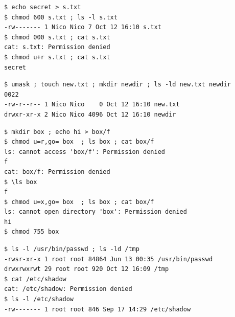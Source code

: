 \documentclass[11pt,a4paper]{article}
\begin{document}
\begin{lstlisting}[caption={Permissions of a file}]
$ echo secret > s.txt
$ chmod 600 s.txt ; ls -l s.txt
-rw------- 1 Nico Nico 7 Oct 12 16:10 s.txt
$ chmod 000 s.txt ; cat s.txt
cat: s.txt: Permission denied
$ chmod u+r s.txt ; cat s.txt
secret
\end{lstlisting}

\begin{lstlisting}[caption={umask and the permissions of new files}]
$ umask ; touch new.txt ; mkdir newdir ; ls -ld new.txt newdir
0022
-rw-r--r-- 1 Nico Nico    0 Oct 12 16:10 new.txt
drwxr-xr-x 2 Nico Nico 4096 Oct 12 16:10 newdir
\end{lstlisting}

\begin{lstlisting}[caption={The box experiment: read-only and execute-only directory}]
$ mkdir box ; echo hi > box/f
$ chmod u=r,go= box  ; ls box ; cat box/f
ls: cannot access 'box/f': Permission denied
f
cat: box/f: Permission denied
$ \ls box
f
$ chmod u=x,go= box  ; ls box ; cat box/f
ls: cannot open directory 'box': Permission denied
hi
$ chmod 755 box
\end{lstlisting}

\begin{lstlisting}[caption={Special bits and a file of another user}]
$ ls -l /usr/bin/passwd ; ls -ld /tmp
-rwsr-xr-x 1 root root 84864 Jun 13 00:35 /usr/bin/passwd
drwxrwxrwt 29 root root 920 Oct 12 16:09 /tmp
$ cat /etc/shadow
cat: /etc/shadow: Permission denied
$ ls -l /etc/shadow
-rw------- 1 root root 846 Sep 17 14:29 /etc/shadow
\end{lstlisting}
\end{document}

